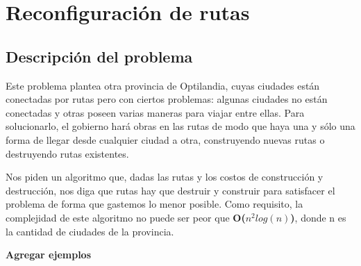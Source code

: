 \section{Reconfiguración de rutas}

\subsection{Descripción del problema}
Este problema plantea otra provincia de Optilandia, cuyas ciudades están conectadas por rutas pero con ciertos problemas: algunas ciudades no están conectadas y otras poseen varias maneras para viajar entre ellas. Para solucionarlo, el gobierno hará obras en las rutas de modo que haya una y sólo una forma de llegar desde cualquier ciudad a otra, construyendo nuevas rutas o destruyendo rutas existentes.
\\
\par
Nos piden un algoritmo que, dadas las rutas y los costos de construcción y destrucción, nos diga que rutas hay que destruir y construir para satisfacer el problema de forma que gastemos lo menor posible. Como requisito, la complejidad de este algoritmo no puede ser peor que \textbf{O($n^2log(n)$)}, donde n es la cantidad de ciudades de la provincia.
\\
\par
\textbf{Agregar ejemplos}
\\
\par

